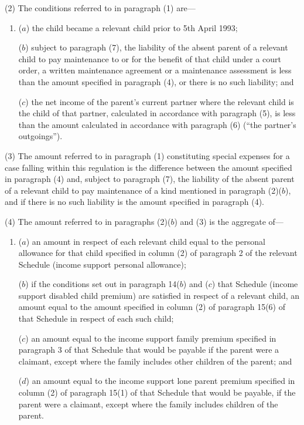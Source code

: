 \documentclass[a4paper]{article}
\begin{document}
(2) The conditions referred to in paragraph (1) are—
\begin{enumerate}\item[]
($a$) the child became a relevant child prior to 5th April 1993;

($b$) subject to paragraph (7), the liability of the absent parent of a relevant
child to pay maintenance to or for the benefit of that child under a court
order, a written maintenance agreement or a maintenance assessment is less than
the amount specified in paragraph (4), or there is no such liability; and

($c$) the net income of the parent’s current partner where the relevant child is
the child of that partner, calculated in accordance with paragraph (5), is less
than the amount calculated in accordance with paragraph (6) (“the partner’s
outgoings”).
\end{enumerate}

(3) The amount referred to in paragraph (1) constituting special expenses for a
case falling within this regulation is the difference between the amount
specified in paragraph (4) and, subject to paragraph (7), the liability of the
absent parent of a relevant child to pay maintenance of a kind mentioned in
paragraph (2)($b$), and if there is no such liability is the amount specified in
paragraph (4).

(4) The amount referred to in paragraphs (2)($b$) and (3) is the aggregate of—
\begin{enumerate}\item[]
($a$) an amount in respect of each relevant child equal to the personal allowance
for that child specified in column (2) of paragraph 2 of the relevant Schedule
(income support personal allowance);

($b$) if the conditions set out in paragraph 14($b$) and ($c$) that Schedule (income
support disabled child premium) are satisfied in respect of a relevant child, an
amount equal to the amount specified in column (2) of paragraph 15(6) of that
Schedule in respect of each such child;

($c$) an amount equal to the income support family premium specified in paragraph 3
of that Schedule that would be payable if the parent were a claimant, except
where the family includes other children of the parent; and

($d$) an amount equal to the income support lone parent premium specified in column
(2) of paragraph 15(1) of that Schedule that would be payable, if the parent
were a claimant, except where the family includes children of the parent.
\end{enumerate}
\end{document}
